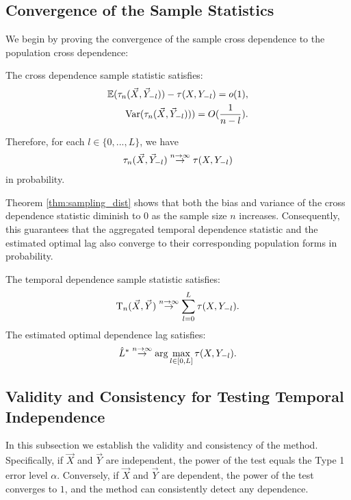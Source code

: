\subsection{Convergence of the Sample Statistics}

We begin by proving the convergence of the sample cross dependence to the population cross dependence:
\begin{theorem}
    \label{thm:sampling_dist}
     The cross dependence sample statistic satisfies:
    \begin{align*}
     \mathbb{E}(\tau_{n}(\vec{X}, \vec{Y}_{-l})) - \tau(X, Y_{-l}) = o(1),\\
     \text{Var}(\tau_{n}(\vec{X}, \vec{Y}_{-l})))  = O(\frac{1}{n-l}).
     \end{align*}

     Therefore, for each $l \in \{0,...,L\}$, we have
     \begin{align*}
     \tau_{n}(\vec{X}, \vec{Y}_{-l}) \stackrel{n \rightarrow \infty}{\rightarrow} \tau(X, Y_{-l})
     \end{align*}
     in probability.
\end{theorem}
Theorem \ref{thm:sampling_dist} shows that both the bias and variance of the cross dependence statistic diminish to $0$ as the sample size $n$ increases. Consequently, this guarantees that the aggregated temporal dependence statistic and the estimated optimal lag also converge to their corresponding population forms in probability.
\begin{theorem}
    \label{thm:optlag}  
    The temporal dependence sample statistic satisfies:
    \begin{align*}
     \mathrm{T}_{n}(\vec{X}, \vec{Y}) \stackrel{n \rightarrow \infty}{\rightarrow} \sum_{l=0}^{L}\tau(X, Y_{-l}).
     \end{align*}
     The estimated optimal dependence lag satisfies:
     \begin{align*}
     \hat{L}^{*} \stackrel{n \rightarrow \infty}{\rightarrow} \arg\max_{l \in [0,L]} \tau(X, Y_{-l}).
     \end{align*}
\end{theorem}

\subsection{Validity and Consistency for Testing Temporal Independence}
In this subsection we establish the validity and consistency of the method. Specifically, if $\vec{X}$ and $\vec{Y}$ are independent, the power of the test equals the Type 1 error level $\alpha$. Conversely, if $\vec{X}$ and $\vec{Y}$ are dependent, the power of the test converges to $1$, and the method can consistently detect any dependence. 

